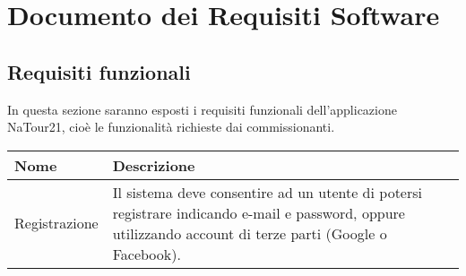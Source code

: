\documentclass{natourDoc}
\begin{document}
\section{Documento dei Requisiti Software}
	\subsection{Requisiti funzionali}
	In questa sezione saranno esposti i requisiti funzionali dell'applicazione NaTour21, cioè le funzionalità richieste dai commissionanti.

	\begin{center}
		\begin{tabular}{ |p{5cm}|p{10.3cm}| } 
		 \hline
		 \rowcolor{gray!30}
		 \textbf{Nome} & \textbf{Descrizione} \\
		 \hline
		  Registrazione & Il sistema deve consentire ad un utente di potersi registrare indicando e-mail e password, oppure utilizzando account di terze parti (Google o Facebook).\\ 
		 \hline
		\end{tabular}
		\end{center}
\end{document}
